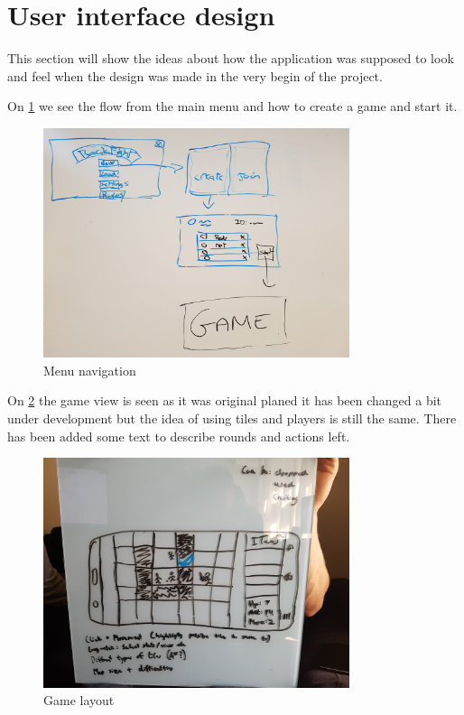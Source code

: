 \section{User interface design}
This section will show the ideas about how the application was supposed to look and feel when the design was made in the very begin of the project.

On \ref{navigation} we see the flow from the main menu and how to create a game and start it.

\begin{figure}
	\centering
	\includegraphics[width=0.8\textwidth]{images/Gui.png}
	\caption{Menu navigation \label{navigation}}
\end{figure}


On \ref{gameLayout} the game view is seen as it was original planed it has been changed a bit under development but the idea of using tiles and players is still the same. There has been added some text to describe rounds and actions left.

\begin{figure}
	\centering
	\includegraphics[width=0.8\textwidth]{images/GameView.png}
	\caption{Game layout \label{gameLayout}}
\end{figure}
